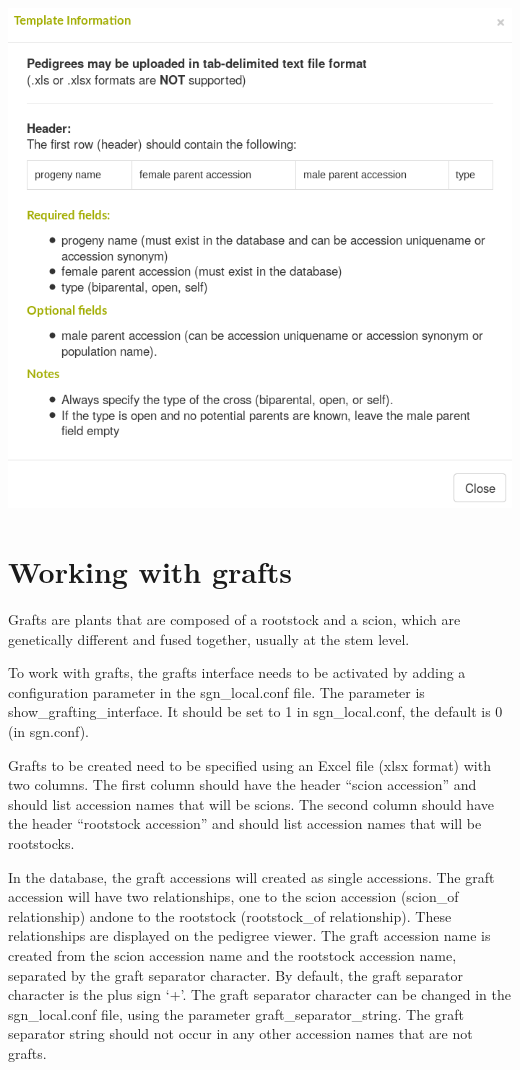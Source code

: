 \documentclass[
  12pt,
]{book}
\begin{document}
\begin{center}\includegraphics[width=0.75\linewidth]{assets/images/pedigree_upload_format} \end{center}

\hypertarget{working-with-grafts}{%
\section{Working with grafts}\label{working-with-grafts}}

Grafts are plants that are composed of a rootstock and a scion, which are genetically different and fused together, usually at the stem level.

To work with grafts, the grafts interface needs to be activated by adding a configuration parameter in the sgn\_local.conf file. The parameter is show\_grafting\_interface. It should be set to 1 in sgn\_local.conf, the default is 0 (in sgn.conf).

Grafts to be created need to be specified using an Excel file (xlsx format) with two columns. The first column should have the header ``scion accession'' and should list accession names that will be scions. The second column should have the header ``rootstock accession'' and should list accession names that will be rootstocks.

In the database, the graft accessions will created as single accessions. The graft accession will have two relationships, one to the scion accession (scion\_of relationship) andone to the rootstock (rootstock\_of relationship). These relationships are displayed on the pedigree viewer. The graft accession name is created from the scion accession name and the rootstock accession name, separated by the graft separator character. By default, the graft separator character is the plus sign `+'. The graft separator character can be changed in the sgn\_local.conf file, using the parameter graft\_separator\_string. The graft separator string should not occur in any other accession names that are not grafts.
\end{document}
